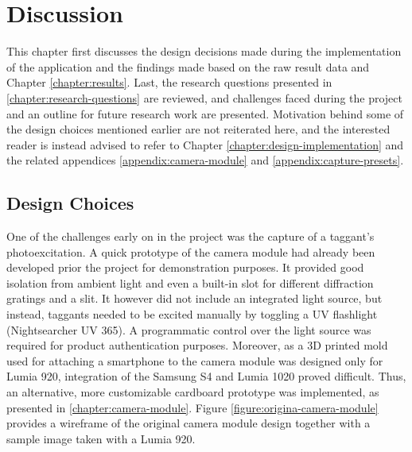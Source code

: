 \documentclass[thesis.tex]{subfiles}
\begin{document}
\chapter{Discussion}
\label{chapter:discussion}

This chapter first discusses the design decisions made during the implementation of the application and the findings made based on the raw result data and Chapter \ref{chapter:results}. Last, the research questions presented in \ref{chapter:research-questions} are reviewed, and challenges faced during the project and an outline for future research work are presented. Motivation behind some of the design choices mentioned earlier are not reiterated here, and the interested reader is instead advised to refer to Chapter \ref{chapter:design-implementation} and the related appendices \ref{appendix:camera-module} and \ref{appendix:capture-presets}.

\section{Design Choices}

One of the challenges early on in the project was the capture of a taggant's photoexcitation. A quick prototype of the camera module had already been developed prior the project for demonstration purposes. It provided good isolation from ambient light and even a built-in slot for different diffraction gratings and a slit. It however did not include an integrated light source, but instead, taggants needed to be excited manually by toggling a UV flashlight (Nightsearcher UV 365). A programmatic control over the light source was required for product authentication purposes. Moreover, as a 3D printed mold used for attaching a smartphone to the camera module was designed only for Lumia 920, integration of the Samsung S4 and Lumia 1020 proved difficult. Thus, an alternative, more customizable cardboard prototype was implemented, as presented in \ref{chapter:camera-module}. Figure \ref{figure:origina-camera-module} provides a wireframe of the original camera module design together with a sample image taken with a Lumia 920.
\end{document}
